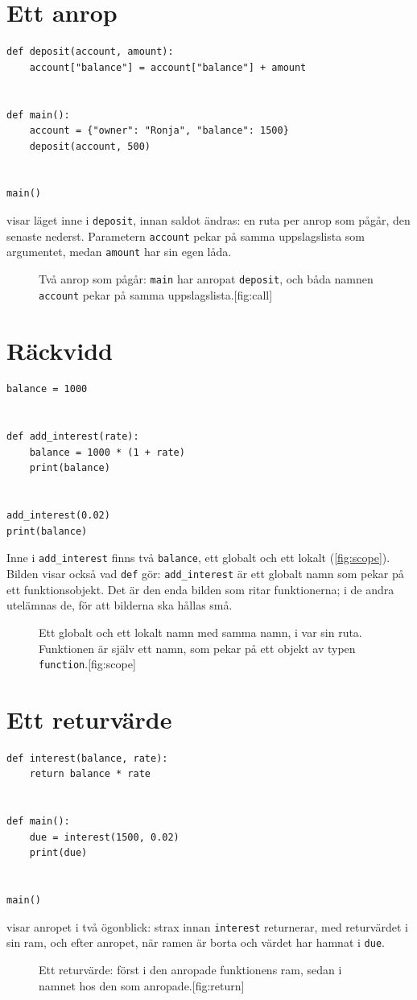 \documentclass[a4paper,10pt,oneside,openright,
               oldfontcommands]{memoir}
\newcommand{\entry}[3]{%
  \begin{figure}[htbp]
    \begin{sidecaption}{#2}[fig:#1]
      #3
    \end{sidecaption}
  \end{figure}
}
\begin{document}
\section{Ett anrop}

\begin{verbatim}
def deposit(account, amount):
    account["balance"] = account["balance"] + amount


def main():
    account = {"owner": "Ronja", "balance": 1500}
    deposit(account, 500)


main()
\end{verbatim}
 visar läget inne i \texttt{deposit}, innan
saldot ändras: en ruta per anrop som pågår, den senaste nederst.
Parametern \texttt{account} pekar på samma uppslagslista
som argumentet, medan \texttt{amount} har sin egen låda.
\entry{call}{Två anrop som pågår: \texttt{main} har anropat
  \texttt{deposit}, och båda namnen \texttt{account} pekar på samma
  uppslagslista.}{\figCall}

\section{Räckvidd}

\begin{verbatim}
balance = 1000


def add_interest(rate):
    balance = 1000 * (1 + rate)
    print(balance)


add_interest(0.02)
print(balance)
\end{verbatim}
Inne i \texttt{add_interest} finns två
\texttt{balance}, ett globalt och ett lokalt
(\cref{fig:scope}).  Bilden visar också vad
\texttt{def} gör: \texttt{add_interest} är ett
globalt namn som pekar på ett funktionsobjekt.  Det är den enda bilden
som ritar funktionerna; i de andra utelämnas de, för att bilderna ska
hållas små.
\entry{scope}{Ett globalt och ett lokalt namn med samma namn, i var
  sin ruta.  Funktionen är själv ett namn, som pekar på ett objekt av
  typen \texttt{function}.}{\figScope}

\section{Ett returvärde}

\begin{verbatim}
def interest(balance, rate):
    return balance * rate


def main():
    due = interest(1500, 0.02)
    print(due)


main()
\end{verbatim}
 visar anropet i två ögonblick: strax innan
\texttt{interest} returnerar, med returvärdet i sin ram, och
efter anropet, när ramen är borta och värdet har hamnat i
\texttt{due}.
\entry{return}{Ett returvärde: först i den anropade funktionens ram,
  sedan i namnet hos den som anropade.}{\figReturn}
\end{document}
